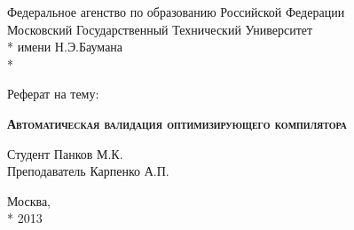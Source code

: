 \begin{titlepage}
    \newpage
    
    \begin{center}
        Федеральное агенство по образованию Российской Федерации \\
        Московский Государственный Технический Университет \\*
        имени Н.Э.Баумана \\*
        \vspace{-12mm}
        \begin{figure}[h]
        \end{figure}
        \vspace{-16mm}
        \hrulefill
    \end{center}
    \begin{center}
        \Large Реферат на тему:
    \end{center}
    
    \vspace{2.5em}
    
    \begin{center}
        \textsc{\textbf{Автоматическая валидация оптимизирующего компилятора}}
    \end{center}
    
    \vspace{6em}
    
    \begin{flushleft}
        \hspace{8.5cm}Студент \hrulefill Панков М.К. \\
        \vspace{1.5em}
        \hspace{8.5cm}Преподаватель \hrulefill Карпенко А.П.\\
    \end{flushleft}
    
    \vspace{\fill}
    
    \begin{center}
        Москва, \\*
        2013
    \end{center}

\end{titlepage}
